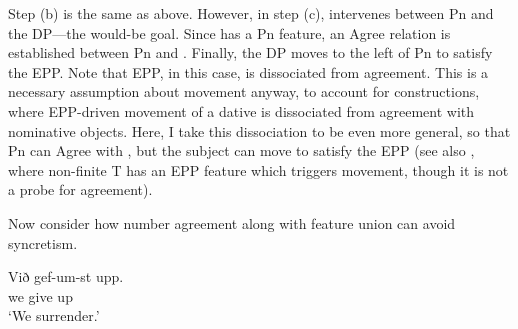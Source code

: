 \documentclass[output=paper,colorlinks,citecolor=brown,
]{langscibook}
\def\exattr#1{\hfill{} #1}
\begin{document}
Step (b) is the same as above. 
However, in step (c), \stin{} intervenes between Pn and the DP---the would-be goal. Since \stin{} has a Pn feature, an Agree relation is established between Pn and \stin{}. 
Finally, the DP moves to the left of Pn to satisfy the EPP. Note that EPP, in this case, is dissociated from agreement. This is a necessary assumption about movement anyway, to account for \datnom constructions, where EPP-driven movement of a dative is dissociated from agreement with nominative objects.
Here, I take this dissociation to be even more general, so that Pn can Agree with \stin, but the subject can move to satisfy the EPP (see also \citet[118]{baker2010agreement}, where non-finite T has an EPP feature which triggers movement, though it is not a probe for agreement).

Now consider how number agreement along with feature union can avoid syncretism.

\ea
{\gll Við gef-um-st upp.  \\
we\nom{} give up \\
\glt `We surrender.'}
\exattr{\cite[3]{Kissock:1997gm}}%
\z



% 

\end{document}
